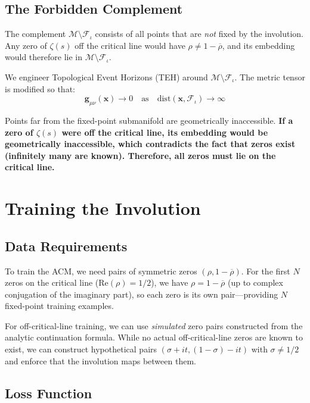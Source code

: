 \documentclass{article}
\begin{document}
\subsection{The Forbidden Complement}

The complement $\mathcal{M} \setminus \mathcal{F}_\iota$ consists of all points
that are \emph{not} fixed by the involution.  Any zero of $\zeta(s)$ off the
critical line would have $\rho \neq 1 - \overline{\rho}$, and its embedding
would therefore lie in $\mathcal{M} \setminus \mathcal{F}_\iota$.

We engineer Topological Event Horizons (TEH) around
$\mathcal{M} \setminus \mathcal{F}_\iota$.  The metric tensor is modified so
that:
\begin{equation}
\mathbf{g}_{\mu\nu}(\mathbf{x}) \to 0 \quad \text{as} \quad
\mathrm{dist}(\mathbf{x}, \mathcal{F}_\iota) \to \infty
\end{equation}

Points far from the fixed-point submanifold are geometrically inaccessible.
\textbf{If a zero of $\zeta(s)$ were off the critical line, its embedding would
be geometrically inaccessible, which contradicts the fact that zeros exist
(infinitely many are known).  Therefore, all zeros must lie on the critical
line.}

\section{Training the Involution}
\label{sec:training}

\subsection{Data Requirements}

To train the ACM, we need pairs of symmetric zeros $(\rho, 1-\overline{\rho})$.
For the first $N$ zeros on the critical line ($\mathrm{Re}(\rho) = 1/2$), we
have $\rho = 1 - \overline{\rho}$ (up to complex conjugation of the imaginary
part), so each zero is its own pair---providing $N$ fixed-point training
examples.

For off-critical-line training, we can use \emph{simulated} zero pairs
constructed from the analytic continuation formula.  While no actual
off-critical-line zeros are known to exist, we can construct hypothetical
pairs $(\sigma + it, (1-\sigma) - it)$ with $\sigma \neq 1/2$ and enforce
that the involution maps between them.

\subsection{Loss Function}
\end{document}
